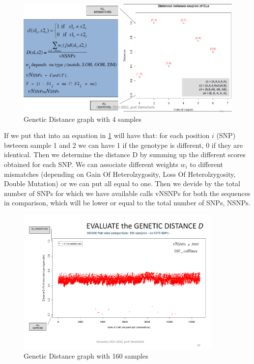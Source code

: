 \begin{figure}[ht]
	\centering
	\includegraphics[width=1\textwidth]{Distance.PNG}
	\caption{Genetic Distance graph with 4 samples}
	\label{fig:Distance}
\end{figure}

If we put that into an equation in \ref{fig:Distance} will have that: for each
position $i$ (SNP) bwteeen sample 1 and 2 we can have 1 if the genotype is
different, 0 if they are identical. Then we determine the distance D by summing
up the different scores obtained for each SNP. We can associate different
weights $w_i$ to different mismatches (depending on Gain Of Heterolzygosity,
Loss Of Heterolzygosity, Double Mutation) or we can put all equal to one. Then
we devide by the total number of SNPs for which we have available calls vNSNPs
for both the sequences in comparison, which will be lower or equal to the total
number of SNPs, NSNPs. 


\begin{figure}[ht]
	\centering
	\includegraphics[width=0.9\textwidth]{Distance2.PNG}
	\caption{\label{fig:Distance2}Genetic Distance graph with 160 samples}
\end{figure}

